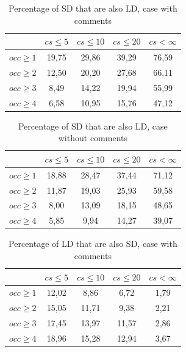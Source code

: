 \documentclass[12pt]{mitthesis}
\begin{document}
\begin{table}[!h]
\renewcommand{\arraystretch}{1}
\caption{Percentage of SD that are also LD, case with comments}
\label{tab:percSD:comm}
\centering

\begin{tabular}{|c|c|c|c|c|}
\hline
	      &	$cs\leq 5$	&	$cs\leq 10$	&	$cs\leq 20$	&	$cs< \infty$	\\
\hline
$occ\geq 1$	&	19,75	&	29,86	&	39,29	&	76,59	\\
$occ\geq 2$	&	12,50	&	20,20	&	27,68	&	66,11	\\
$occ\geq 3$	&	8,49	&	14,22	&	19,94	&	55,99	\\
$occ\geq 4$	&	6,58	&	10,95	&	15,76	&	47,12	\\
\hline
\end{tabular}
\end{table}

\begin{table}[!h]
\renewcommand{\arraystretch}{1}
\caption{Percentage of SD that are also LD, case without comments}
\label{tab:percSD:nocomm}
\centering

\begin{tabular}{|c|c|c|c|c|}
\hline
	      &	$cs\leq 5$	&	$cs\leq 10$	&	$cs\leq 20$	&	$cs< \infty$	\\
\hline
$occ\geq 1$	&	18,88	&	28,47	&	37,44	&	71,12	\\
$occ\geq 2$	&	11,87	&	19,03	&	25,93	&	59,58	\\
$occ\geq 3$	&	8,00	&	13,09	&	18,15	&	48,65	\\
$occ\geq 4$	&	5,85	&	9,94	&	14,27	&	39,07	\\
\hline
\end{tabular}
\end{table}

\begin{table}[!h]
\renewcommand{\arraystretch}{1}
\caption{Percentage of LD that are also SD, case with comments}
\label{tab:percLD:comm}
\centering

\begin{tabular}{|c|c|c|c|c|}
\hline
	      &	$cs\leq 5$	&	$cs\leq 10$	&	$cs\leq 20$	&	$cs< \infty$	\\
\hline
$occ\geq 1$	&	12,02	&	8,86	&	6,72	&	1,79	\\
$occ\geq 2$	&	15,05	&	11,71	&	9,38	&	2,21	\\
$occ\geq 3$	&	17,45	&	13,97	&	11,57	&	2,86	\\
$occ\geq 4$	&	18,96	&	15,28	&	12,94	&	3,67	\\
\hline
\end{tabular}
\end{table}
\end{document}

